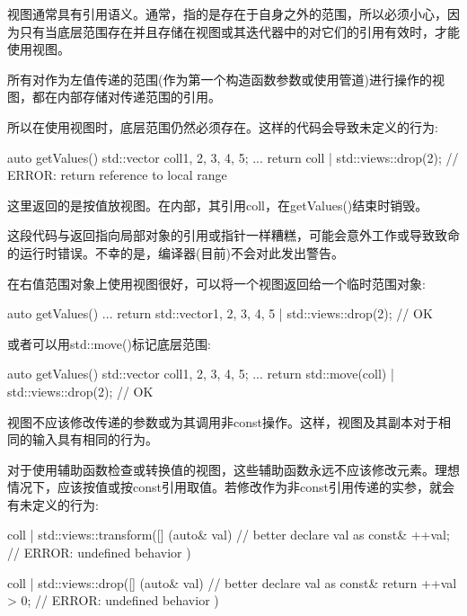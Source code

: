 
视图通常具有引用语义。通常，指的是存在于自身之外的范围，所以必须小心，因为只有当底层范围存在并且存储在视图或其迭代器中的对它们的引用有效时，才能使用视图。


所有对作为左值传递的范围(作为第一个构造函数参数或使用管道)进行操作的视图，都在内部存储对传递范围的引用。

所以在使用视图时，底层范围仍然必须存在。这样的代码会导致未定义的行为:

\begin{cpp}
auto getValues()
{
	std::vector coll{1, 2, 3, 4, 5};
	...
	return coll | std::views::drop(2); // ERROR: return reference to local range
}
\end{cpp}

这里返回的是按值放视图。在内部，其引用coll，在getValues()结束时销毁。

这段代码与返回指向局部对象的引用或指针一样糟糕，可能会意外工作或导致致命的运行时错误。不幸的是，编译器(目前)不会对此发出警告。

在右值范围对象上使用视图很好，可以将一个视图返回给一个临时范围对象:

\begin{cpp}
auto getValues()
{
	...
	return std::vector{1, 2, 3, 4, 5} | std::views::drop(2); // OK
}
\end{cpp}

或者可以用std::move()标记底层范围:

\begin{cpp}
auto getValues()
{
	std::vector coll{1, 2, 3, 4, 5};
	...
	return std::move(coll) | std::views::drop(2); // OK
}
\end{cpp}


视图不应该修改传递的参数或为其调用非const操作。这样，视图及其副本对于相同的输入具有相同的行为。

对于使用辅助函数检查或转换值的视图，这些辅助函数永远不应该修改元素。理想情况下，应该按值或按const引用取值。若修改作为非const引用传递的实参，就会有未定义的行为:

\begin{cpp}
coll | std::views::transform([] (auto& val) { // better declare val as const&
	++val; // ERROR: undefined behavior
})

coll | std::views::drop([] (auto& val) { // better declare val as const&
	return ++val > 0; // ERROR: undefined behavior
})
\end{cpp}


